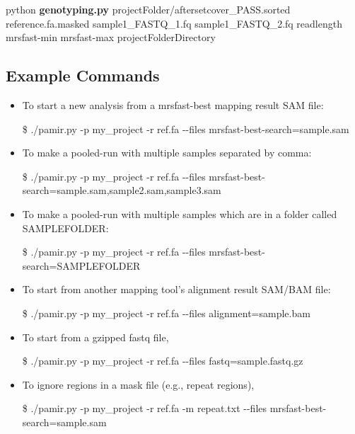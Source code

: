 \documentclass{article}
\begin{document}
python \textbf{genotyping.py} projectFolder/aftersetcover\_PASS.sorted reference.fa.masked sample1\_FASTQ\_1.fq sample1\_FASTQ\_2.fq readlength mrsfast-min mrsfast-max projectFolderDirectory  

\subsection{Example Commands}
\begin{itemize}

\item To start a new analysis from a mrsfast-best mapping result SAM file:
\begin{flushleft}
\$ ./pamir.py -p my\_project -r ref.fa -{}-files mrsfast-best-search=sample.sam
\end{flushleft}

\item To make a pooled-run with multiple samples separated by comma: 
\begin{flushleft}
\$ ./pamir.py -p my\_project -r ref.fa  -{}-files mrsfast-best-search=sample.sam,sample2.sam,sample3.sam
\end{flushleft}

\item To make a pooled-run with multiple samples which are in a folder called SAMPLEFOLDER: 
\begin{flushleft}
\$ ./pamir.py -p my\_project -r ref.fa  -{}-files mrsfast-best-search=SAMPLEFOLDER
\end{flushleft}

\item To start from another mapping tool's alignment result SAM/BAM file:
\begin{flushleft}
\$ ./pamir.py -p my\_project -r ref.fa -{}-files alignment=sample.bam
\end{flushleft}

\item To start from a gzipped fastq file,
\begin{flushleft}
\$ ./pamir.py -p my\_project -r ref.fa -{}-files fastq=sample.fastq.gz
\end{flushleft}

\item To ignore regions in a mask file (e.g., repeat regions), 
\begin{flushleft}
\$ ./pamir.py -p my\_project -r ref.fa -m repeat.txt -{}-files mrsfast-best-search=sample.sam
\end{flushleft}


\end{itemize}
\end{document}
